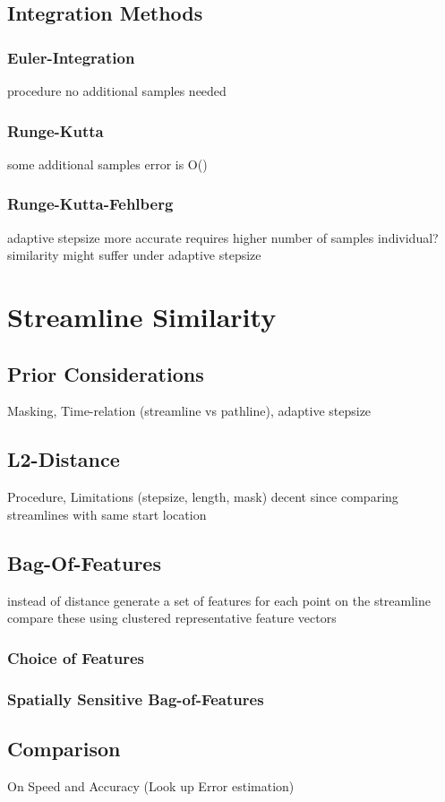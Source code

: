\section{Integration Methods}

\subsection{Euler-Integration}
procedure
no additional samples needed
\subsection{Runge-Kutta}
some additional samples
error is O()
\subsection{Runge-Kutta-Fehlberg}
adaptive stepsize
more accurate
requires higher number of samples
individual?
similarity might suffer under adaptive stepsize
\chapter{Streamline Similarity}
\section{Prior Considerations}
Masking, Time-relation (streamline vs pathline), adaptive stepsize
\section{L2-Distance}
Procedure, Limitations (stepsize, length, mask)
decent since comparing streamlines with same start location
\section{Bag-Of-Features}
instead of distance generate a set of features for each point on the streamline
compare these using clustered representative feature vectors
\subsection{Choice of Features}

\subsection{Spatially Sensitive Bag-of-Features}
\section{Comparison}
On Speed and Accuracy
(Look up Error estimation)